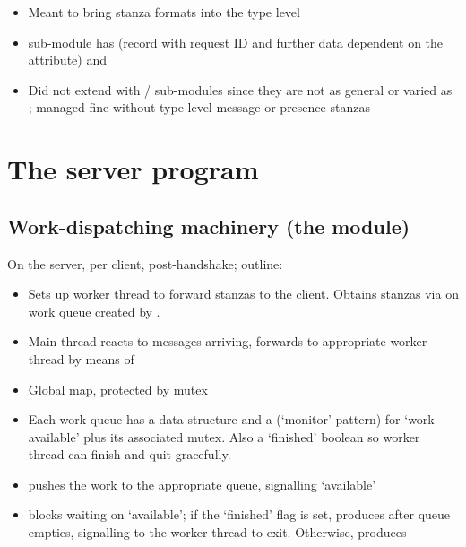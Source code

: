 \documentclass[12pt,a4paper,twoside,openright]{report}
\begin{document}
{\begin{itemize}
  \item Meant to bring stanza formats into the type level

  \item {} sub-module has  (record with request ID and further data dependent on the  attribute) and 

  \item Did not extend with  /  sub-modules since they are not as general or varied as ; managed fine without type-level message or presence stanzas
\end{itemize}

\section{The server program}
\subsection{Work-dispatching machinery (the  module)}
On the server, per client, post-handshake; outline:

\begin{itemize}
  \item Sets up worker thread to forward stanzas to the client. Obtains stanzas via  on work queue created by .

  \item Main thread reacts to messages arriving, forwards to appropriate worker thread by means of 

  \item Global  map, protected by mutex

  \item Each work-queue has a  data structure and a  (`monitor' pattern) for `work available' plus its associated mutex. Also a `finished' boolean so worker thread can finish and quit gracefully.

  \item {} pushes the work to the appropriate queue, signalling `available'

  \item {} blocks waiting on `available'; if the `finished' flag is set, produces  after queue empties, signalling to the worker thread to exit. Otherwise, produces 


\end{itemize}}
\end{document}
